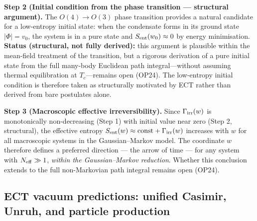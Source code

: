 \documentclass[11pt,a4paper]{article}
\numberwithin{equation}{section}
\begin{document}
\textbf{Step 2 (Initial condition from the phase transition --- structural argument).}
The $O(4)\!\to\!O(3)$ phase transition provides a natural candidate
for a low-entropy initial state: when the condensate forms in its
ground state $|\Phi|=v_0$, the system is in a pure state and
$S_{\rm ent}(w_0)\approx0$ by energy minimisation.
\textbf{Status (structural, not fully derived):}  this argument is
plausible within the mean-field treatment of the transition, but a
rigorous derivation of a pure initial state from the full many-body
Euclidean path integral---without assuming thermal equilibration at
$T_c$---remains open (OP24).  The low-entropy initial condition
is therefore taken as structurally motivated by ECT rather than
derived from bare postulates alone.

\textbf{Step 3 (Macroscopic effective irreversibility).}
Since $\Gamma_{\rm irr}(w)$ is monotonically non-decreasing
(Step 1) with initial value near zero (Step 2, structural),
the effective entropy $S_{\rm ent}(w)\approx\mathrm{const}+\Gamma_{\rm irr}(w)$
increases with $w$ for all macroscopic systems in the Gaussian--Markov
model.  The coordinate $w$ therefore defines a preferred direction
--- the arrow of time --- for any system with $N_{\rm eff}\gg1$,
\emph{within the Gaussian--Markov reduction}.  Whether this conclusion
extends to the full non-Markovian path integral remains open (OP24).


\subsection{ECT vacuum predictions: unified Casimir, Unruh, and particle production}
\label{sec:vacuum_summary_tables}
\end{document}
